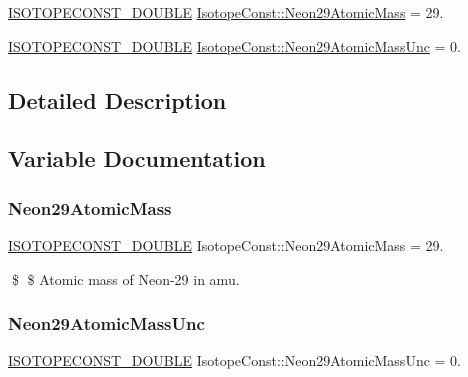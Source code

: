 \begin{DoxyCompactItemize}
\item 
\mbox{\hyperlink{group___isotope_const-_macros_ga8f45a7272ce02c0b4c65c44636ed719a}{I\+S\+O\+T\+O\+P\+E\+C\+O\+N\+S\+T\+\_\+\+D\+O\+U\+B\+LE}} \mbox{\hyperlink{group___isotope_const-_neon-_ne29_ga13197a2af369ce039df0c9ae0618b770}{Isotope\+Const\+::\+Neon29\+Atomic\+Mass}} = 29.
\item 
\mbox{\hyperlink{group___isotope_const-_macros_ga8f45a7272ce02c0b4c65c44636ed719a}{I\+S\+O\+T\+O\+P\+E\+C\+O\+N\+S\+T\+\_\+\+D\+O\+U\+B\+LE}} \mbox{\hyperlink{group___isotope_const-_neon-_ne29_gabdaad8c4d50df14536627caeb8453c23}{Isotope\+Const\+::\+Neon29\+Atomic\+Mass\+Unc}} = 0.
\end{DoxyCompactItemize}


\subsection{Detailed Description}


\subsection{Variable Documentation}
\mbox{\label{group___isotope_const-_neon-_ne29_ga13197a2af369ce039df0c9ae0618b770}} 
\subsubsection{\texorpdfstring{Neon29\+Atomic\+Mass}{Neon29AtomicMass}}
{\footnotesize\ttfamily \mbox{\hyperlink{group___isotope_const-_macros_ga8f45a7272ce02c0b4c65c44636ed719a}{I\+S\+O\+T\+O\+P\+E\+C\+O\+N\+S\+T\+\_\+\+D\+O\+U\+B\+LE}} Isotope\+Const\+::\+Neon29\+Atomic\+Mass = 29.}

\$ \$ Atomic mass of Neon-\/29 in amu. \mbox{\label{group___isotope_const-_neon-_ne29_gabdaad8c4d50df14536627caeb8453c23}} 
\subsubsection{\texorpdfstring{Neon29\+Atomic\+Mass\+Unc}{Neon29AtomicMassUnc}}
{\footnotesize\ttfamily \mbox{\hyperlink{group___isotope_const-_macros_ga8f45a7272ce02c0b4c65c44636ed719a}{I\+S\+O\+T\+O\+P\+E\+C\+O\+N\+S\+T\+\_\+\+D\+O\+U\+B\+LE}} Isotope\+Const\+::\+Neon29\+Atomic\+Mass\+Unc = 0.}

